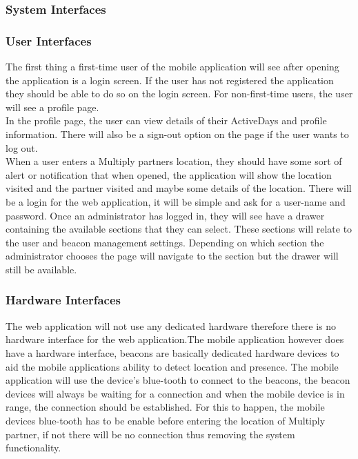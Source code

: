 \documentclass[11pt]{article}
\begin{document}
\subsubsection{System Interfaces}

\subsubsection{User Interfaces}
The first thing a first-time user of the mobile application will see after opening the application is a login screen. If the user has not registered the application they should be able to do so on the login screen. For non-first-time users, the user will see a profile page.\\
In the profile page, the user can view details of their ActiveDays and profile information. There will also be a sign-out option on the page if the user wants to log out.\\
When a user enters a Multiply partners location, they should have some sort of alert or notification that when opened, the application will show the location visited and the partner visited and maybe some details of the location.
There will be a login for the web application, it will be simple and ask for a user-name and password. Once an administrator has logged in, they will see have a drawer containing the available sections that they can select. These sections will relate to the user and beacon management settings. Depending on which section the administrator chooses the page will navigate to the section but the drawer will still be available.
\subsubsection{Hardware Interfaces}
The web application will not use any dedicated hardware therefore there is no hardware interface for the web application.The mobile application however does have a hardware interface, beacons are basically dedicated hardware devices to aid the mobile applications ability to detect location and presence. The mobile application will use the device's blue-tooth to connect to the beacons, the beacon devices will always be waiting for a connection and when the mobile device is in range, the connection should be established. For this to happen, the mobile devices blue-tooth has to be enable before entering the location of  Multiply partner, if not there will be no connection thus removing the system functionality.
\end{document}
